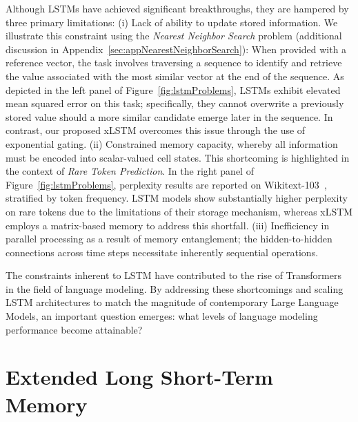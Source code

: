 Although LSTMs have achieved significant breakthroughs, they are hampered by three primary limitations: (i) Lack of ability to update stored information. We illustrate this constraint using the {\it Nearest Neighbor Search} problem (additional discussion in Appendix~\ref{sec:appNearestNeighborSearch}): When provided with a reference vector, the task involves traversing a sequence to identify and retrieve the value associated with the most similar vector at the end of the sequence. As depicted in the left panel of Figure~\ref{fig:lstmProblems}, LSTMs exhibit elevated mean squared error on this task; specifically, they cannot overwrite a previously stored value should a more similar candidate emerge later in the sequence. In contrast, our proposed xLSTM overcomes this issue through the use of exponential gating. (ii) Constrained memory capacity, whereby all information must be encoded into scalar-valued cell states. This shortcoming is highlighted in the context of {\it Rare Token Prediction}. In the right panel of Figure~\ref{fig:lstmProblems}, perplexity results are reported on Wikitext-103~\citep{Merity:17}, stratified by token frequency. LSTM models show substantially higher perplexity on rare tokens due to the limitations of their storage mechanism, whereas xLSTM employs a matrix-based memory to address this shortfall. (iii) Inefficiency in parallel processing as a result of memory entanglement; the hidden-to-hidden connections across time steps necessitate inherently sequential operations.

The constraints inherent to LSTM have contributed to the rise of Transformers~\citep{Vaswani:17} in the field of language modeling. By addressing these shortcomings and scaling LSTM architectures to match the magnitude of contemporary Large Language Models, an important question emerges: what levels of language modeling performance become attainable?

\section{Extended Long Short-Term Memory}
\label{sec:xLSTM}


